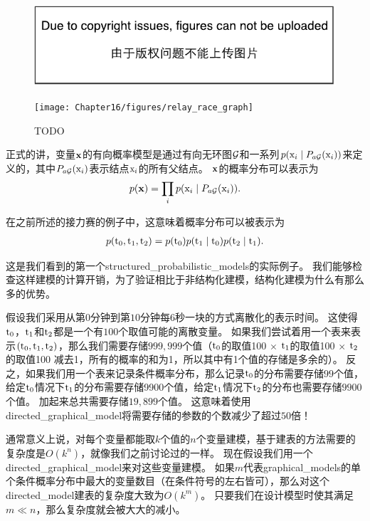 \begin{figure}[!htb]
\ifOpenSource
\centerline{\includegraphics{figure.pdf}}
\else
	\centerline{\texttt{[image: Chapter16/figures/relay\_race\_graph]}}	
\fi
	\caption{TODO}
	\label{fig:relay_race_graph}
\end{figure}


正式的讲，变量$\mathbf{x}$的有向概率模型是通过有向无环图$\mathcal{G}$和一系列$p(\mathrm{x}_i\mid P_{a\mathcal{G}}(\mathrm{x}_i))$来定义的，其中$P_{a\mathcal{G}}(\mathrm{x}_i)$表示结点$\mathrm{x}_i$的所有父结点。
$\mathbf{x}$的概率分布可以表示为
\begin{align}
\label{eqn:161}
p(\mathbf{x}) = \prod_{i} p(\mathrm{x}_i\mid P_{a\mathcal{G}}(\mathrm{x}_i)).
\end{align}


在之前所述的接力赛的例子中，这意味着概率分布可以被表示为
\begin{align}
\label{eqn:162}
p(\mathrm{t}_0,\mathrm{t}_1,\mathrm{t}_2) = p(\mathrm{t}_0)p(\mathrm{t}_1\mid \mathrm{t}_0)p(\mathrm{t}_2\mid \mathrm{t}_1).
\end{align}


这是我们看到的第一个\gls{structured_probabilistic_models}的实际例子。
我们能够检查这样建模的计算开销，为了验证相比于非结构化建模，结构化建模为什么有那么多的优势。


假设我们采用从第$0$分钟到第$10$分钟每$6$秒一块的方式离散化的表示时间。
这使得$\mathrm{t}_0$，$\mathrm{t}_1$和$\mathrm{t}_2$都是一个有$100$个取值可能的离散变量。
如果我们尝试着用一个表来表示$(\mathrm{t}_0,\mathrm{t}_1,\mathrm{t}_2)$，那么我们需要存储$999,999$个值（$\mathrm{t}_0$的取值100 $\times$ $\mathrm{t}_1$的取值100 $\times$ $\mathrm{t}_2$的取值100 减去1，所有的概率的和为1，所以其中有1个值的存储是多余的）。
反之，如果我们用一个表来记录条件概率分布，那么记录$\mathrm{t}_0$的分布需要存储$99$个值，给定$\mathrm{t}_0$情况下$\mathrm{t}_1$的分布需要存储9900个值，给定$\mathrm{t}_1$情况下$\mathrm{t}_2$的分布也需要存储$9900$个值。
加起来总共需要存储$19, 899$个值。
这意味着使用\gls{directed_graphical_model}将需要存储的参数的个数减少了超过$50$倍！


通常意义上说，对每个变量都能取$k$个值的$n$个变量建模，基于建表的方法需要的复杂度是$O(k^n)$，就像我们之前讨论过的一样。
现在假设我们用一个\gls{directed_graphical_model}来对这些变量建模。
如果$m$代表\gls{graphical_models}的单个条件概率分布中最大的变量数目（在条件符号的左右皆可），那么对这个\gls{directed_model}建表的复杂度大致为$O(k^m)$。
只要我们在设计模型时使其满足$m\ll n$，那么复杂度就会被大大的减小。



